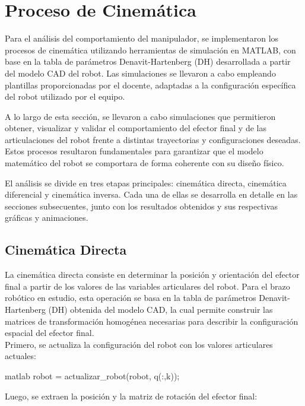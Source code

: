 \section{Proceso de Cinemática} \label{sec:proceso_cinematica}

Para el análisis del comportamiento del manipulador, se implementaron los procesos de cinemática utilizando herramientas de simulación en MATLAB, con base en la tabla de parámetros Denavit-Hartenberg (DH) desarrollada a partir del modelo CAD del robot.
Las simulaciones se llevaron a cabo empleando plantillas proporcionadas por el docente, adaptadas a la configuración específica del robot utilizado por el equipo.

A lo largo de esta sección, se llevaron a cabo simulaciones que permitieron obtener, visualizar y validar el comportamiento del efector final y de las articulaciones del robot frente a distintas trayectorias y configuraciones deseadas. Estos procesos resultaron fundamentales para garantizar que el modelo matemático del robot se comportara de forma coherente con su diseño físico.

El análisis se divide en tres etapas principales: cinemática directa, cinemática diferencial y cinemática inversa. Cada una de ellas se desarrolla en detalle en las secciones subsecuentes, junto con los resultados obtenidos y sus respectivas gráficas y animaciones.

\subsection{Cinemática Directa} \label{subsec:cinematica_directa}

La cinemática directa consiste en determinar la posición y orientación del efector final a partir de los valores de las variables articulares del robot. Para el brazo robótico en estudio, esta operación se basa en la tabla de parámetros Denavit-Hartenberg (DH) obtenida del modelo CAD, la cual permite construir las matrices de transformación homogénea necesarias para describir la configuración espacial del efector final. \\

Primero, se actualiza la configuración del robot con los valores articulares actuales:

\begin{matlabcode}{matlab}
	robot = actualizar_robot(robot, q(:,k));
\end{matlabcode}

Luego, se extraen la posición y la matriz de rotación del efector final:

